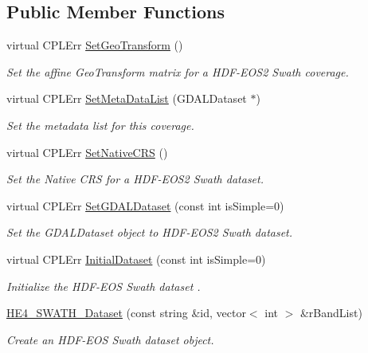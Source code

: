 \subsection*{Public Member Functions}
\begin{DoxyCompactItemize}
\item 
virtual CPLErr \hyperlink{classHE4__SWATH__Dataset_a898be04259ed34592cbff87b2dd2680c}{SetGeoTransform} ()
\begin{DoxyCompactList}\small\item\em Set the affine GeoTransform matrix for a HDF-\/EOS2 Swath coverage. \end{DoxyCompactList}\item 
virtual CPLErr \hyperlink{classHE4__SWATH__Dataset_a71289ad4d22695120264b190e9170eb1}{SetMetaDataList} (GDALDataset $\ast$)
\begin{DoxyCompactList}\small\item\em Set the metadata list for this coverage. \end{DoxyCompactList}\item 
virtual CPLErr \hyperlink{classHE4__SWATH__Dataset_abc9a1e86eba1e386e38e3771e4102df4}{SetNativeCRS} ()
\begin{DoxyCompactList}\small\item\em Set the Native CRS for a HDF-\/EOS2 Swath dataset. \end{DoxyCompactList}\item 
virtual CPLErr \hyperlink{classHE4__SWATH__Dataset_aba0769c876c341494ba043f5cbcdef9a}{SetGDALDataset} (const int isSimple=0)
\begin{DoxyCompactList}\small\item\em Set the GDALDataset object to HDF-\/EOS2 Swath dataset. \end{DoxyCompactList}\item 
virtual CPLErr \hyperlink{classHE4__SWATH__Dataset_ac65fb00ef5ac627fb996e46442c07444}{InitialDataset} (const int isSimple=0)
\begin{DoxyCompactList}\small\item\em Initialize the HDF-\/EOS Swath dataset . \end{DoxyCompactList}\item 
\hyperlink{classHE4__SWATH__Dataset_a354e9e0923628cbfa6f7e6864afeba36}{HE4\_\-SWATH\_\-Dataset} (const string \&id, vector$<$ int $>$ \&rBandList)
\begin{DoxyCompactList}\small\item\em Create an HDF-\/EOS Swath dataset object. \end{DoxyCompactList}\item 

\end{DoxyCompactItemize}
